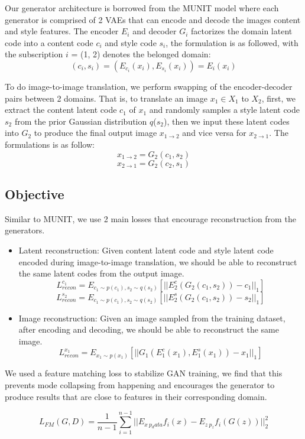 \documentclass[12pt]{report}
\begin{document}
Our generator architecture is borrowed from the MUNIT model \cite{munit} where each generator is comprised of 2 VAEs that can encode and decode the images content and style features. The encoder $E_i$ and decoder $G_i$ factorizes the domain latent code into a content code $c_i$ and style code $s_i$, the formulation is as followed, with the subscription $i$ = (1, 2) denotes the belonged domain:
\[(c_i, s_i) =  (E_{c_i}(x_i), E_{s_i}(x_i)) = E_i(x_i)\]

To do image-to-image translation, we perform swapping of the encoder-decoder pairs between 2 domains. That is, to translate an image $x_1$$\in$$X_1$ to $X_2$, first, we extract the content latent code $c_1$ of $x_1$ and randomly samples a style latent code $s_2$ from the prior Gaussian distribution $q$($s_2$), then we input these latent codes into $G_2$ to produce the final output image $x_{1\rightarrow2}$ and vice versa for $x_{2\rightarrow1}$. The formulations is as follow:
\[x_{1\rightarrow2} = G_2(c_1, s_2)\]
\[x_{2\rightarrow1} = G_2(c_2, s_1)\]

\subsection{Objective}
Similar to MUNIT\cite{munit}, we use 2 main losses that encourage reconstruction from the generators.
\begin{itemize}
	\item Latent reconstruction: Given content latent code and style latent code encoded during image-to-image translation, we should be able to reconstruct the same latent codes from the output image.
\[L^{c_1}_{recon} = E_{{c_1}\sim p(c_1), s_2 \sim q(s_2)}[||E^c_2(G_2(c_1,s_2)) - c_1||_1]\]
\[L^{s_2}_{recon} = E_{{c_1}\sim p(c_1), s_2 \sim q(s_2)}[||E^s_2(G_2(c_1,s_2)) - s_2||_1]\]
	\item Image reconstruction: Given an image sampled from the training dataset, after encoding and decoding, we should be able to reconstruct the same image.
\[L^{x_1}_{recon} = E_{{x_1}\sim p(x_1)}[||G_1(E^c_1(x_1), E^s_1(x_1)) - x_1||_1]\]
\end{itemize}

We used a feature matching loss\cite{fm-loss} to stabilize GAN training, we find that this prevents mode collapsing from happening and encourages the generator to produce results that are close to features in their corresponding domain.

\[L_{FM}(G, D) = \frac{1}{n - 1} \sum_{i=1}^{n-1} ||E_{x~p_data}f_i(x) - E_{z~p_z}f_i(G(z))||_2^2 \]
\end{document}
